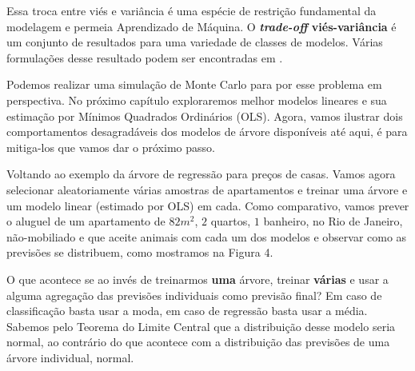 Essa troca entre viés e variância é uma espécie de restrição fundamental da modelagem e permeia Aprendizado de Máquina. O \textbf{\textit{trade-off} viés-variância} é um conjunto de resultados para uma variedade de classes de modelos. Várias formulações desse resultado podem ser encontradas em .

Podemos realizar uma simulação de Monte Carlo para por esse problema em perspectiva. No próximo capítulo exploraremos melhor modelos lineares e sua estimação por Mínimos Quadrados Ordinários (OLS). Agora, vamos ilustrar dois comportamentos desagradáveis dos modelos de árvore disponíveis até aqui, é para mitiga-los que vamos dar o próximo passo. 

Voltando ao exemplo da árvore de regressão para preços de casas. Vamos agora selecionar aleatoriamente várias amostras de apartamentos e treinar uma árvore e um modelo linear (estimado por OLS) em cada. Como comparativo, vamos prever o aluguel de um apartamento de $82m^2$, $2$ quartos, $1$ banheiro, no Rio de Janeiro, não-mobiliado e que aceite animais com cada um dos modelos e observar como as previsões se distribuem, como mostramos na Figura 4.

\begin{figure}[H]
    \centering
        \label{fig:arvore_var_ols}
\end{figure}


O que acontece se ao invés de treinarmos \textbf{uma} árvore, treinar \textbf{várias} e usar a alguma agregação das previsões individuais como previsão final? Em caso de classificação basta usar a moda, em caso de regressão basta usar a média. Sabemos pelo Teorema do Limite Central que a distribuição desse modelo seria normal, ao contrário do que acontece com a distribuição das previsões de uma árvore individual, normal. 


